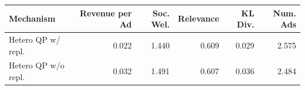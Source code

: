 \begin{tabular}{lrrrrr}
\hline
Mechanism & Revenue per Ad & Soc. Wel. & Relevance & KL Div. & Num. Ads \\
\hline
Hetero QP w/ repl. & 0.022 & 1.440 & 0.609 & 0.029 & 2.575 \\
Hetero QP w/o repl. & 0.032 & 1.491 & 0.607 & 0.036 & 2.484 \\
\hline
\end{tabular}
